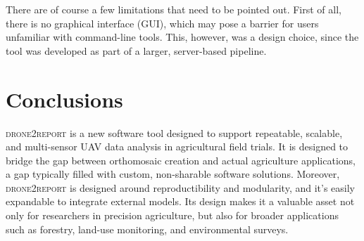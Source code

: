 \documentclass[drones,technicalnote,accept,pdftex,moreauthors]{Definitions/mdpi}
\begin{document}
There are of course a few limitations that need to be pointed out. 
First of all, there is no graphical interface (GUI), which may pose a barrier for users unfamiliar with command-line tools. This, however, was a design choice, since the tool was developed as part of a larger, server-based pipeline.


\section{Conclusions}
\label{conclusions}

\textsc{drone2report} is a new software tool designed to support repeatable, scalable, and multi-sensor UAV data analysis in agricultural field trials. It is designed to bridge the gap between orthomosaic creation and actual agriculture applications, a gap typically filled with custom, non-sharable software solutions. Moreover, \textsc{drone2report} is designed around reproductibility and modularity, and it's easily expandable to integrate external models. Its design makes it a valuable asset not only for researchers in precision agriculture, but also for broader applications such as forestry, land-use monitoring, and environmental surveys.

\vspace{6pt}


\supplementary{ }





\end{document}
